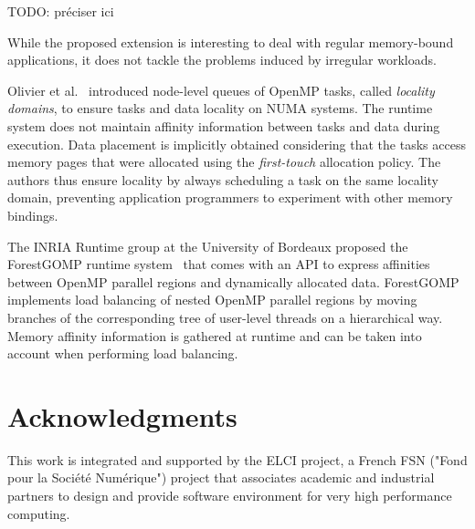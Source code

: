 \documentclass{Styles/llncs}
\begin{document}
TODO: préciser ici

While the proposed extension is interesting
to deal with regular memory-bound applications, it does not tackle
the problems induced by irregular workloads.

Olivier et
al.~\cite{Olivier:2012:CMW:2388996.2389085}
introduced node-level queues of OpenMP tasks, called \textit{locality
  domains}, to ensure tasks and data locality on NUMA systems. The
runtime system does not maintain affinity information between tasks
and data during execution. Data placement is implicitly obtained
considering that the tasks access memory pages that were allocated
using the \textit{first-touch} allocation policy. The authors thus
ensure locality by always scheduling a task on the same locality
domain, preventing application programmers to experiment with other
memory bindings.

The INRIA Runtime group at the University of Bordeaux proposed the
ForestGOMP runtime system~\cite{BroFurGogWacNam10IJPP} that comes
with an API to express affinities between OpenMP parallel regions and
dynamically allocated data. ForestGOMP implements load balancing of
nested OpenMP parallel regions by moving branches of the corresponding
tree of user-level threads on a hierarchical way. Memory affinity
information is gathered at runtime and can be taken into account when
performing load balancing.


\section*{Acknowledgments}


This work is integrated and supported by the ELCI  project, a French FSN ("Fond pour la Société Numérique")
project that associates academic and industrial partners to design and provide software environment for very high performance
computing.
  \small 

\end{document}
